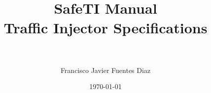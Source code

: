 \documentclass[paper=a4, fontsize=11pt]{scrartcl} %
\title{	
\normalfont \normalsize 
\horrule{0.5pt} \\[0.4cm] %
\Huge  SafeTI Manual \\ %
\vspace{10px}
\LARGE Traffic Injector Specifications \\ %
\horrule{0.5pt} \\[0.4cm] %
}
\author{Francisco Javier Fuentes Diaz} %
\date{\today} %
\numberwithin{equation}{section} %
\numberwithin{figure}{section} %
\numberwithin{table}{section} %
\begin{document}
\nocite{*}
\maketitle %

\newpage
\tableofcontents






\end{document}
